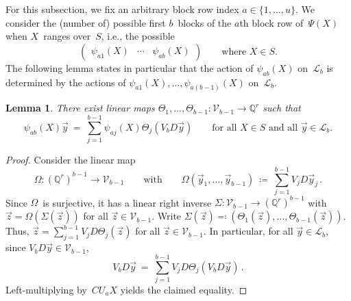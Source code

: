 \documentclass{lmcs}
\newtheorem{lemma}[thm]{Lemma}
\theoremstyle{definition}
\newcommand{\cL}{\mathcal{L}}
\newcommand{\Q}{\mathbb{Q}}
\newcommand{\V}{\mathcal{V}}
\begin{document}
For this subsection, we fix an arbitrary block row index $a \in \{1, \ldots, u\}$.
We consider the (number of) possible first $b$~blocks of the $a$th block row of~$\Psi(X)$ when $X$~ranges over~$S$, i.e., the possible
\[
\begin{pmatrix} \psi_{a 1}(X) & \cdots & \psi_{a b}(X) \end{pmatrix} \qquad \text{where $X \in S$.}
\]
The following lemma states in particular that the action of $\psi_{a b}(X)$ on~$\cL_b$ is determined by the actions of $\psi_{a 1}(X), \ldots, \psi_{a (b-1)}(X)$ on~$\cL_b$.

\begin{lemma} \label{lem:identity-on-Lb}
There exist linear maps $\Theta_1, \ldots, \Theta_{b-1} : \V_{b-1} \to \Q^r$ such that 
\[
 \psi_{a b}(X) \vec{y} \ = \ \sum_{j=1}^{b-1} \psi_{a j}(X) \Theta_j(V_b D \vec{y}) \qquad \text{for all $X \in S$ and all $\vec{y} \in \cL_b$.}
\]
\end{lemma}
\begin{proof}
Consider the linear map
\[
\Omega : (\Q^r)^{b-1} \to \V_{b-1} \qquad \text{with} \qquad \Omega(\vec{y}_1, \ldots, \vec{y}_{b-1}) \ \coloneqq \ \sum_{j=1}^{b-1} V_j D \vec{y}_j\,.
\]
Since $\Omega$~is surjective, it has a linear right inverse $\Sigma : \V_{b-1} \to (\Q^r)^{b-1}$ with $\vec{z} = \Omega(\Sigma(\vec{z}))$ for all $\vec{z} \in \V_{b-1}$.
Write $\Sigma(\vec{z}) \eqqcolon (\Theta_1(\vec{z}), \ldots, \Theta_{b-1}(\vec{z}))$.
Thus, $\vec{z} = \sum_{j=1}^{b-1} V_j D \Theta_j(\vec{z})$ for all $\vec{z} \in \V_{b-1}$.
In particular, for all $\vec{y} \in \cL_b$, since $V_b D \vec{y} \in \V_{b-1}$,
\[
 V_b D \vec{y} \ = \ \sum_{j=1}^{b-1} V_j D \Theta_j(V_b D \vec{y})\,.
\]
Left-multiplying by~$C U_a X$ yields the claimed equality.
\end{proof}
\end{document}
